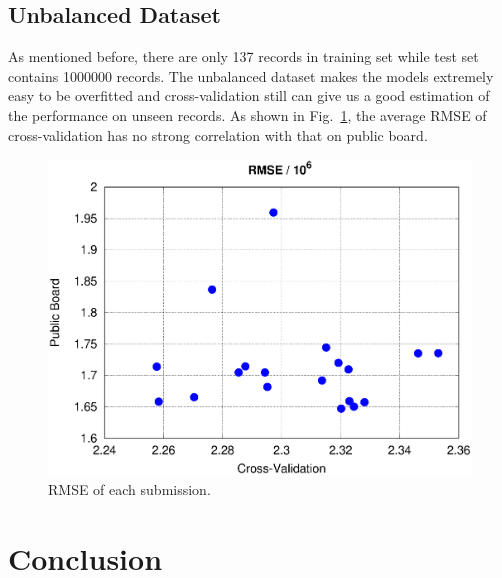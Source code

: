 \documentclass[11pt, oneside]{article}   	%
\newcommand\figref{Fig.~\ref}
\begin{document}


\subsection{Unbalanced Dataset}
As mentioned before, there are only 137 records in training set while test set contains 1000000 records.
The unbalanced dataset makes the models extremely easy to be overfitted and cross-validation still can give us a good estimation of the performance on unseen records.
As shown in \figref{fig:cv_lb_error}, the average RMSE of cross-validation has no strong correlation with that on public board.

\begin{figure}[htbp] %
   \centering
   \includegraphics[width=5in]{figs/scores.eps} 
   \caption{RMSE of each submission.}
   \label{fig:cv_lb_error}
\end{figure}


\section{Conclusion}
\end{document}
